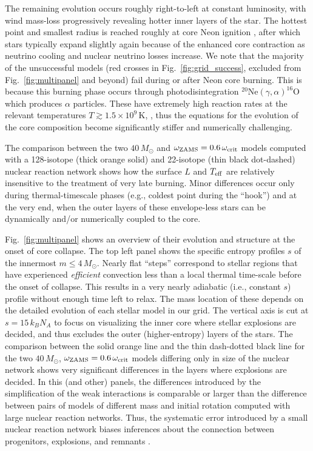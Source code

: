 \documentclass[%
trackchanges,twocolumn]{aastex701}
\DeclareRobustCommand{\Figref}[1]{Fig.~\ref{#1}}
\begin{document}
The remaining evolution occurs roughly right-to-left at constant
luminosity, with wind mass-loss progressively revealing hotter inner
layers of the star. The hottest point and smallest radius is reached
roughly at core Neon ignition \citep{gottlieb:24}, after which stars
typically expand slightly again because of the enhanced core
contraction as neutrino cooling and nuclear neutrino losses increase.
We note that the majority of the unsuccessful models (red crosses in
\Figref{fig:grid_success}, excluded from \Figref{fig:multipanel} and
beyond) fail during or after Neon core burning. This is because this
burning phase occurs through photodisintegration
$^{20}\mathrm{Ne}(\gamma, \alpha)^{16}\mathrm{O}$ which produces
$\alpha$ particles. These have extremely high reaction rates at the
relevant temperatures $T \gtrsim 1.5\times10^{9}\,\mathrm{K}$,
\citep{kippenhahn:13}, thus the equations for the evolution of the
core composition become significantly stiffer and numerically
challenging.

The comparison between the two $40\,M_{\odot}$ and
$\omega_{\rm ZAMS}=0.6\,\omega_{\rm crit}$ models computed with a
128-isotope (thick orange solid) and 22-isotope (thin black
dot-dashed) nuclear reaction network shows how the surface $L$ and
$T_{\rm eff}$ are relatively insensitive to the treatment of very late
burning. Minor differences occur only during thermal-timescale phases
(e.g., coldest point during the ``hook'') and at the very end, when
the outer layers of these envelope-less stars can be dynamically
and/or numerically coupled to the core.

\Figref{fig:multipanel} shows an overview of their evolution and
structure at the onset of core collapse. The top left panel shows the
specific entropy profiles $s$ of the innermost $m\le4\,M_{\odot}$.
Nearly flat ``steps'' correspond to stellar regions that have
experienced \emph{efficient} convection less than a local thermal
time-scale before the onset of collapse. This results in a very nearly
adiabatic (i.e., constant $s$) profile without enough time left to
relax. The mass location of these depends on the detailed evolution of
each stellar model in our grid. The vertical axis is cut at
$s=15\,k_{B}N_{A}$ to focus on visualizing the inner core where
stellar explosions are decided, and thus excludes the outer
(higher-entropy) layers of the stars. The comparison between the solid
orange line and the thin dash-dotted black line for the two
$40\,M_{\odot}$, $\omega_{\rm ZAMS}=0.6\,\omega_{\rm crit}$ models
differing only in size of the nuclear network shows very significant
differences in the layers where explosions are decided. In this (and
other) panels, the differences introduced by the simplification of the
weak interactions is comparable or larger than the difference between
pairs of models of different mass and initial rotation computed with
large nuclear reaction networks. Thus, the systematic error introduced
by a small nuclear reaction network biases inferences about the
connection between progenitors, explosions, and remnants
\citep{farmer:16, renzo:24}.
\end{document}
